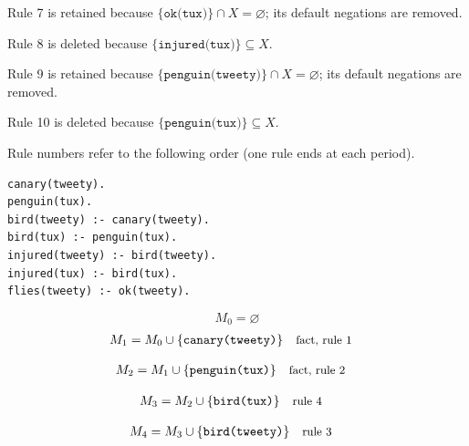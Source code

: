 \documentclass[a4paper,11pt]{article}
\newif\ifexplain
\newcommand{\explain}[1]{\ifexplain\begin{erklbox}#1\end{erklbox}\fi}
\newcommand{\why}[1]{\text{\small #1}}
\newcommand{\at}[1]{\texttt{#1}}
\begin{document}
Rule 7 is retained because $\{\at{ok(tux)}\}\cap X=\varnothing$; its default negations are removed.

Rule 8 is deleted because $\{\at{injured(tux)}\}\subseteq X$.

Rule 9 is retained because $\{\at{penguin(tweety)}\}\cap X=\varnothing$; its default negations are removed.

Rule 10 is deleted because $\{\at{penguin(tux)}\}\subseteq X$.

Rule numbers refer to the following order (one rule ends at each period).
\begin{small}
\begin{verbatim}
canary(tweety).
penguin(tux).
bird(tweety) :- canary(tweety).
bird(tux) :- penguin(tux).
injured(tweety) :- bird(tweety).
injured(tux) :- bird(tux).
flies(tweety) :- ok(tweety).
\end{verbatim}
\end{small}
\explain{Beim Redukt bleibt die Kandidatenmenge fest. Wir entscheiden zuerst, welche Regeln wegfallen. Erst danach berechnen wir aus den verbleibenden positiven Regeln die kleinste abgeschlossene Menge. Ein Modell allein reicht nicht: Diese Menge muss genau der Kandidat sein.}
\[
M_0=\varnothing
\]
\begin{align*}
M_{1} &= M_{0}\cup \{\at{canary(tweety)}\} && \why{fact, rule 1}
\end{align*}
\explain{Diese Regel hat keinen Körper. Ihr Kopf $\at{canary(tweety)}$ ist damit ein Fakt und muss in die Menge.}
\begin{align*}
M_{2} &= M_{1}\cup \{\at{penguin(tux)}\} && \why{fact, rule 2}
\end{align*}
\explain{Diese Regel hat keinen Körper. Ihr Kopf $\at{penguin(tux)}$ ist damit ein Fakt und muss in die Menge.}
\begin{align*}
M_{3} &= M_{2}\cup \{\at{bird(tux)}\} && \why{rule 4}
\end{align*}
\explain{Für $\at{bird(tux)}$ brauchen wir $\at{penguin(tux)}$. Weil diese Voraussetzungen bereits hergeleitet sind, dürfen wir den Regelkopf jetzt aufnehmen und alle bisherigen Atome behalten; bei einer fehlenden Voraussetzung würde diese Regel dagegen noch nichts beitragen.}
\begin{align*}
M_{4} &= M_{3}\cup \{\at{bird(tweety)}\} && \why{rule 3}
\end{align*}
\explain{Für $\at{bird(tweety)}$ brauchen wir $\at{canary(tweety)}$. Weil diese Voraussetzungen bereits hergeleitet sind, dürfen wir den Regelkopf jetzt aufnehmen und alle bisherigen Atome behalten; bei einer fehlenden Voraussetzung würde diese Regel dagegen noch nichts beitragen.}
\end{document}
